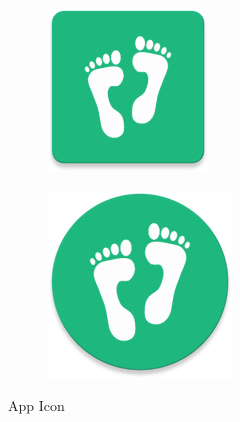 \documentclass{usireport}
\begin{document}
\begin{figure}[H]
    \centering
    \begin{subfigure}[b]{0.2\textwidth}
        \includegraphics[width=\textwidth]{fig/ic_launcher.png}
    \end{subfigure}
    \hspace{2cm}
    \begin{subfigure}[b]{0.2\textwidth}
        \includegraphics[width=\textwidth]{fig/ic_launcher_round.png}
    \end{subfigure}
    \caption{App Icon}
    \label{fig:app_icon}
\end{figure}
\end{document}
